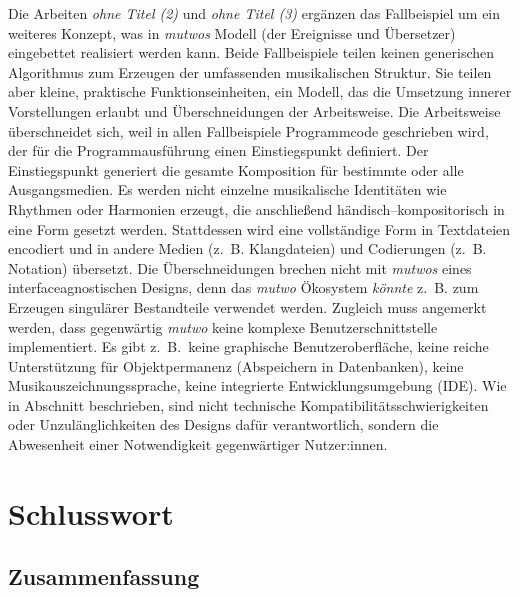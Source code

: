 \documentclass[12pt,a4paper,ngerman]{article}
\begin{document}
Die Arbeiten \emph{ohne Titel (2)} und  \emph{ohne Titel (3)} ergänzen das Fallbeispiel  um ein weiteres Konzept, was in \emph{mutwos} Modell (der Ereignisse und Übersetzer) eingebettet realisiert werden kann.
Beide Fallbeispiele teilen keinen generischen Algorithmus zum Erzeugen der umfassenden musikalischen Struktur.
Sie teilen aber kleine, praktische Funktionseinheiten, ein Modell, das die Umsetzung innerer Vorstellungen erlaubt und Überschneidungen der Arbeitsweise.
Die Arbeitsweise überschneidet sich, weil in allen Fallbeispiele Programmcode geschrieben wird, der für die Programmausführung einen Einstiegspunkt definiert.
Der Einstiegspunkt generiert die gesamte Komposition für bestimmte oder alle Ausgangsmedien.
Es werden nicht einzelne musikalische Identitäten wie Rhythmen oder Harmonien erzeugt, die anschließend händisch--kompositorisch in eine Form gesetzt werden.
Stattdessen wird eine vollständige Form in Textdateien encodiert und in andere Medien (z.~B. Klangdateien) und Codierungen (z.~B. Notation) übersetzt.
Die Überschneidungen brechen nicht mit \emph{mutwos} \emph{} eines interfaceagnostischen Designs, denn das \emph{mutwo} Ökosystem \emph{könnte} z.~B. zum Erzeugen singulärer Bestandteile verwendet werden.
Zugleich muss angemerkt werden, dass gegenwärtig  \emph{mutwo} keine komplexe Benutzerschnittstelle implementiert. 
Es gibt z.~B.\ keine graphische Benutzeroberfläche, keine reiche Unterstützung für Objektpermanenz (Abspeichern in Datenbanken), keine Musikauszeichnungssprache, keine integrierte Entwicklungsumgebung (IDE).
Wie in Abschnitt \emph{} beschrieben, sind nicht technische Kompatibilitätsschwierigkeiten oder Unzulänglichkeiten des Designs dafür verantwortlich, sondern die Abwesenheit einer Notwendigkeit gegenwärtiger Nutzer:innen.


\section{Schlusswort}

\subsection{Zusammenfassung}
\end{document}
